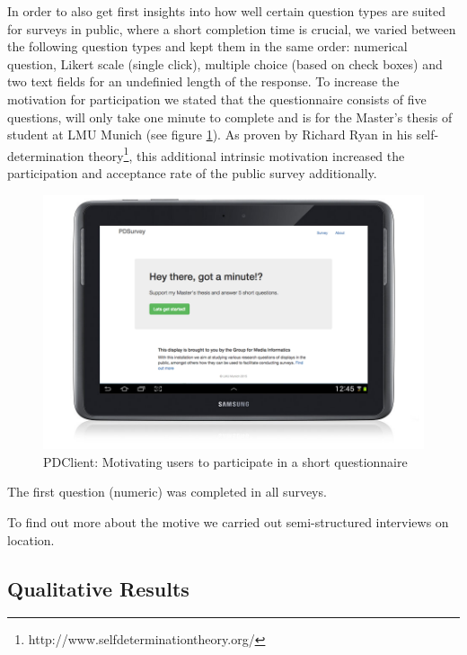 	In order to also get first insights into how well certain question types are suited for surveys in public, where a short completion time is crucial, we varied between the following question types and kept them in the same order: numerical question, Likert scale (single click), multiple choice (based on check boxes) and two text fields for an undefinied length of the response. To increase the motivation for participation we stated that the questionnaire consists of five questions, will only take one minute to complete and is for the Master's thesis of student at LMU Munich (see figure \ref{fig:5-pdclient-intro}).
	As proven by Richard Ryan in his self-determination theory\cite{ryan2000self}\footnote{http://www.selfdeterminationtheory.org/}, this additional intrinsic motivation increased the participation and acceptance rate of the public survey additionally. 

	\begin{figure}
	    \begin{center}
	        \includegraphics[width=.7\columnwidth]{img/5_field-study/pdclient-startscreen.png}
	    \end{center}
	 \caption{PDClient: Motivating users to participate in a short questionnaire}
	 \label{fig:5-pdclient-intro}
	\end{figure}

	The first question (numeric) was completed in all surveys. 




	To find out more about the motive we carried out semi-structured interviews on location.





\subsection{Qualitative Results}

